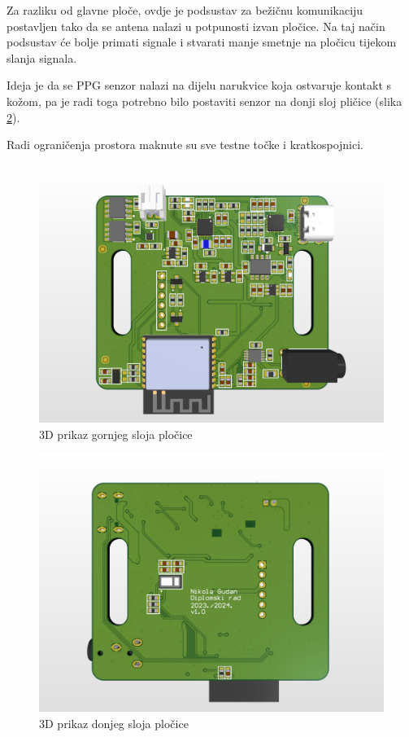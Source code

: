 Za razliku od glavne ploče, ovdje je podsustav za bežičnu komunikaciju postavljen tako da se antena nalazi u potpunosti izvan pločice. Na taj način podsustav će bolje primati signale i stvarati manje smetnje na pločicu tijekom slanja signala.

Ideja je da se PPG senzor nalazi na dijelu narukvice koja ostvaruje kontakt s kožom, pa je radi toga potrebno bilo postaviti senzor na donji sloj pličice (slika \ref{slk:BR_PCB_BOT}).

Radi ograničenja prostora maknute su sve testne točke i kratkospojnici.
\begin{figure}[htb]
    \centering
    \includegraphics[width=10 cm]{Figures/BR_PCB.png}
    \caption{3D prikaz gornjeg sloja pločice}
    \label{slk:BR_PCB_TOP}
\end{figure}
\begin{figure}[htb]
    \centering
    \includegraphics[width=10 cm]{Figures/BR_PCB_BOT.png}
    \caption{3D prikaz donjeg sloja pločice}
    \label{slk:BR_PCB_BOT}
\end{figure}